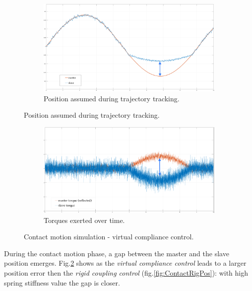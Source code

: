 \begin{figure}[H]
	\begin{subfigure}{1\linewidth}
		\centering
		\includegraphics[width=\textwidth, height=0.45\textwidth]{Images/setPointContactReacPosArrow}
		\caption{Position assumed during trajectory tracking.}
		\label{fig:ContactSetPos}
	\end{subfigure}	
\end{figure}
\begin{figure}[H]\ContinuedFloat
	\begin{subfigure}{1\linewidth}
		\centering
		\includegraphics[width=\textwidth, height=0.45\textwidth]{Images/setPointContactReacTorArrow}
		\caption{Torques exerted over time.}
		\label{fig:ContactSetTor}
	\end{subfigure}	
 \caption{Contact motion simulation - virtual compliance control.}
 \label{fig:contact_virtual}
\end{figure}


During the contact motion phase, a gap between the master and the slave position emerges. Fig.\ref{fig:ContactSetPos} shows as the \textit{virtual compliance control} leads to a larger position error then the \textit{rigid coupling control }(fig.\ref{fig:ContactRigPos}): with high spring stiffness value the gap is closer.

